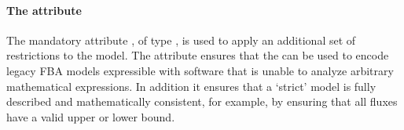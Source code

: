 %

\paragraph{The attribute }

The mandatory attribute , of type , is used to apply an additional set of restrictions to the model. The  attribute ensures that the \FBCPackage can be used to encode legacy FBA models expressible  with software that is unable to analyze arbitrary mathematical expressions. In addition it ensures that a `strict' model is fully described and mathematically consistent, for example, by ensuring that all fluxes have a valid upper or lower bound.

